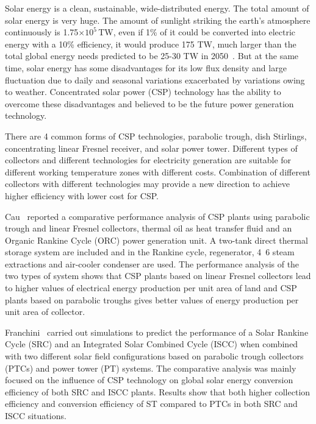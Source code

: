 \documentclass{article}
\begin{document}
Solar energy is a clean, sustainable, wide-distributed energy. The total amount of solar energy is very huge. The amount of sunlight striking the earth's atmosphere continuously is 1.75$\times10^{5}\,$TW, even if 1\% of it could be converted into electric energy with a 10\% efficiency, it would produce 175 TW, much larger than the total global energy needs predicted to be 25-30 TW in 2050~\cite{Goswami2015}. But at the same time, solar energy has some disadvantages for its low flux density and large fluctuation due to daily and seasonal variations exacerbated by variations owing to weather. Concentrated solar power (CSP) technology has the ability to overcome these disadvantages and believed to be the future power generation technology.

There are 4 common forms of CSP technologies, parabolic trough, dish Stirlings, concentrating linear Fresnel receiver, and solar power tower. Different types of collectors and different technologies for electricity generation are suitable for different working temperature zones with different costs. Combination of different collectors with different technologies may provide a new direction to achieve higher efficiency with lower cost for CSP.

Cau~\cite{Cau2014} reported a comparative performance analysis of CSP plants using parabolic trough and linear Fresnel collectors, thermal oil as heat transfer fluid and an Organic Rankine Cycle (ORC) power generation unit. A two-tank direct thermal storage system are included and in the Rankine cycle, regenerator, 4~6 steam extractions and air-cooler condenser are used. The performance analysis of the two types of system shows that CSP plants based on linear Fresnel collectors lead to higher values of electrical energy production per unit area of land and CSP plants based on parabolic troughs gives better values of energy production per unit area of collector.

Franchini~\cite{Franchini2013} carried out simulations to predict the performance of a Solar Rankine Cycle (SRC) and an Integrated Solar Combined Cycle (ISCC) when combined with two different solar field configurations based on parabolic trough collectors (PTCs) and power tower (PT) systems. The comparative analysis was mainly focused on the influence of CSP technology on global solar energy conversion efficiency of both SRC and ISCC plants. Results show that both higher collection efficiency and conversion efficiency of ST compared to PTCs in both SRC and ISCC situations.
\end{document}
